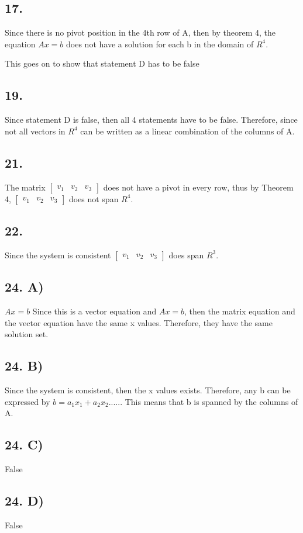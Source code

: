\documentclass[12]{scrartcl}
\begin{document}
\subsection*{17.}
Since there is no pivot position in the 4th row of A, then by theorem 4, the equation $Ax = b$ does not have a solution for each b in the domain of $R^4$.

This goes on to show that statement D has to be false
\subsection*{19.}
Since statement D is false, then all 4 statements have to be false. Therefore, since not all vectors in $R^4$ can be written as a linear combination of the columns of A. 
\subsection*{21.}
The matrix $  \begin{bmatrix} v_1&v_2&v_3  \end{bmatrix} $ does not have a pivot in every row, thus by Theorem 4, $  \begin{bmatrix} v_1&v_2&v_3  \end{bmatrix} $ does not span $R^4$.
\subsection*{22.}
Since the system is consistent  $  \begin{bmatrix} v_1&v_2&v_3  \end{bmatrix} $ does span $R^3$.
\subsection*{24. A)}
 $Ax = b$
Since this is a vector equation and  $Ax = b$, then the matrix equation and the vector equation have the same x values. Therefore, they have the same solution set. 
\subsection*{24. B)}
Since the system is consistent, then the x values exists. Therefore, any b can be expressed by $b = a_1x_1 + a_2x_2.....$. This means that b is spanned by the columns of A. 
\subsection*{24. C)}
False
\subsection*{24. D)}
False
\end{document}
